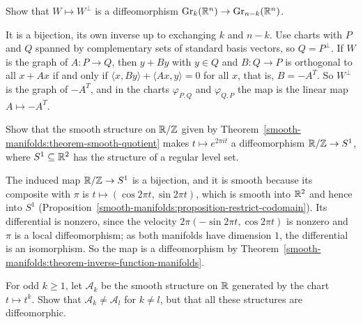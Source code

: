 \begin{exercise}\label{smooth-manifolds:exercise-grassmannian-duality}
Show that $W \mapsto W^\perp$ is a diffeomorphism $\mathrm{Gr}_k(\mathbb{R}^n) \to \mathrm{Gr}_{n-k}(\mathbb{R}^n)$.
\end{exercise}

\begin{solution}
It is a bijection, its own inverse up to exchanging $k$ and $n - k$. Use charts with $P$ and $Q$ spanned by complementary sets of standard basis vectors, so $Q = P^\perp$. If $W$ is the graph of $A \colon P \to Q$, then
$y + By$ with $y \in Q$ and $B \colon Q \to P$ is orthogonal to all $x + Ax$ if and only if $\langle x, By\rangle + \langle Ax, y\rangle = 0$ for all $x$, that is, $B = -A^T$. So $W^\perp$ is the graph of $-A^T$, and in the charts
$\varphi_{P,Q}$ and $\varphi_{Q,P}$ the map is the linear map $A \mapsto -A^T$.
\end{solution}

\begin{exercise}\label{smooth-manifolds:exercise-circle-quotient}
Show that the smooth structure on $\mathbb{R}/\mathbb{Z}$ given by Theorem~\ref{smooth-manifolds:theorem-smooth-quotient} makes $t \mapsto e^{2\pi it}$ a diffeomorphism $\mathbb{R}/\mathbb{Z} \to S^1$, where $S^1 \subseteq \mathbb{R}^2$ has the structure of a regular level set.
\end{exercise}

\begin{solution}
The induced map $\mathbb{R}/\mathbb{Z} \to S^1$ is a bijection, and it is smooth because its composite with $\pi$ is $t \mapsto (\cos 2\pi t, \sin 2\pi t)$, which is smooth
into $\mathbb{R}^2$ and hence into $S^1$ (Proposition~\ref{smooth-manifolds:proposition-restrict-codomain}). Its differential is nonzero, since the velocity
$2\pi(-\sin 2\pi t, \cos 2\pi t)$ is nonzero and $\pi$ is a local diffeomorphism; as both manifolds have dimension $1$, the differential is an isomorphism. So
the map is a diffeomorphism by Theorem~\ref{smooth-manifolds:theorem-inverse-function-manifolds}.
\end{solution}

\begin{exercise}\label{smooth-manifolds:exercise-powers-line}
For odd $k \geq 1$, let $\mathcal{A}_k$ be the smooth structure on $\mathbb{R}$ generated by the chart $t \mapsto t^k$. Show that $\mathcal{A}_k \neq \mathcal{A}_l$
for $k \neq l$, but that all these structures are diffeomorphic.
\end{exercise}

